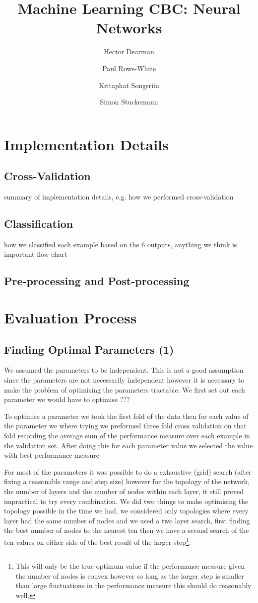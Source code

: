 \documentclass[10pt,a4paper]{article}
\author{Hector Dearman \and Paul Rowe-White \and Kritaphat Songsriin \and Simon Stuckemann}
\title{Machine Learning CBC: Neural Networks}
\begin{document}
\maketitle

\section{Implementation Details}
\subsection{Cross-Validation}
summary of implementation details, e.g. how we performed cross-validation

\subsection{Classification}
how we classified each example based on the 6 outputs, anything we think is important
flow chart

\subsection{Pre-processing and Post-processing}

\section{Evaluation Process}

\subsection{Finding Optimal Parameters (1)}
We assumed the parameters to be independent.
This is not a good assumption since the parameters are not necessarily independent however it is necessary to make the problem of optimising the parameters tractable.
We first set out each parameter we would have to optimise ???

To optimise a parameter we took the first fold of the data then for each value of the parameter we where trying we preformed three fold cross validation on that fold recording the average sum of the performance measure over each example in the validation set.
After doing this for each parameter value we selected the value with best performance measure

For most of the parameters it was possible to do a exhaustive (grid) search (after fixing a reasonable range and step size) however for the topology of the network, the number of layers and the number of nodes within each layer, it still proved impractical to try every combination.
We did two things to make optimising the topology possible in the time we had, we considered only topologies where every layer had the same number of nodes and we used a two layer search, first finding the best number of nodes to the nearest ten then we have a second search of the ten values on either side of the best result of the larger step\footnote{This will only be the true optimum value if the performance measure given the number of nodes is convex however so long as the larger step is smaller than large fluctuations in the performance measure this should do reasonably well.}.
\end{document}
